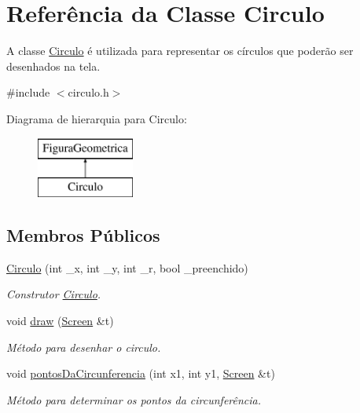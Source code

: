 \hypertarget{class_circulo}{}\section{Referência da Classe Circulo}
\label{class_circulo}


A classe \mbox{\hyperlink{class_circulo}{Circulo}} é utilizada para representar os círculos que poderão ser desenhados na tela.  




{\ttfamily \#include $<$circulo.\+h$>$}

Diagrama de hierarquia para Circulo\+:\begin{figure}[H]
\begin{center}
\leavevmode
\includegraphics[height=2.000000cm]{class_circulo}
\end{center}
\end{figure}
\subsection*{Membros Públicos}
\begin{DoxyCompactItemize}
\item 
\mbox{\hyperlink{class_circulo_ad460c0782d1a35324cd71079f80e3388}{Circulo}} (int \+\_\+x, int \+\_\+y, int \+\_\+r, bool \+\_\+preenchido)
\begin{DoxyCompactList}\small\item\em Construtor \mbox{\hyperlink{class_circulo}{Circulo}}. \end{DoxyCompactList}\item 
void \mbox{\hyperlink{class_circulo_a593787d6e0618c2eded23e8839e7bea6}{draw}} (\mbox{\hyperlink{class_screen}{Screen}} \&t)
\begin{DoxyCompactList}\small\item\em Método para desenhar o circulo. \end{DoxyCompactList}\item 
void \mbox{\hyperlink{class_circulo_a197439e429d6636a4a43d77e02b20486}{pontos\+Da\+Circunferencia}} (int x1, int y1, \mbox{\hyperlink{class_screen}{Screen}} \&t)
\begin{DoxyCompactList}\small\item\em Método para determinar os pontos da circunferência. \end{DoxyCompactList}\end{DoxyCompactItemize}


